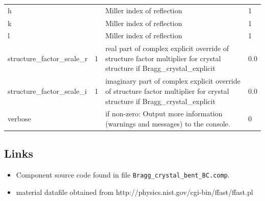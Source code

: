 \begin{longtable}{p{}p{}p{}p{}}
h &   & Miller index of reflection & 1 \\
k &   & Miller index of reflection & 1 \\
l &   & Miller index of reflection & 1 \\
structure\_factor\_scale\_r & 1 & real part of complex explicit override of structure factor multiplier for crystal structure if Bragg\_crystal\_explicit & 0.0 \\
structure\_factor\_scale\_i & 1 & imaginary part of complex explicit override of structure factor multiplier for crystal structure if Bragg\_crystal\_explicit & 0.0 \\
verbose &   & if non-zero: Output more information (warnings and messages) to the console. & 0 \\
\bottomrule
\end{longtable}

\subsection*{Links}
\begin{itemize}
  \item Component source code found in file \texttt{Bragg\_crystal\_bent\_BC.comp}.
  \item material datafile obtained from http://physics.nist.gov/cgi-bin/ffast/ffast.pl
\end{itemize}
